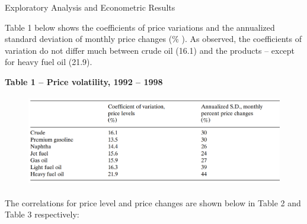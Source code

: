 \documentclass[12pt,twoside]{article}
\begin{document}
\begin{justify}
{\fontsize{11pt}{13.2pt}\selectfont Exploratory Analysis and Econometric Results\par}
\end{justify}\par

\begin{justify}
{\fontsize{11pt}{13.2pt}\selectfont Table 1 below shows the coefficients of price variations and the annualized standard deviation of monthly price changes ($\%$ ). As observed, the coefficients of variation do not differ much between crude oil (16.1) and the products – except for heavy fuel oil (21.9).\par}
\end{justify}\par

\setlength{\parskip}{6.0pt}
\begin{Center}
{\fontsize{11pt}{13.2pt}\selectfont \textbf{Table 1 – Price volatility, 1992 – 1998}\par}
\end{Center}\par




\begin{figure}[H]
	\begin{Center}
		\includegraphics[width=4.94in,height=1.59in]{./media/image3.png}
	\end{Center}
\end{figure}



\begin{justify}
{\fontsize{11pt}{13.2pt}\selectfont \par}
\end{justify}\par

\begin{justify}
{\fontsize{11pt}{13.2pt}\selectfont \par}
\end{justify}
\vspace{\baselineskip}\begin{justify}
{\fontsize{11pt}{13.2pt}\selectfont The correlations for price level and price changes are shown below in Table 2 and Table 3 respectively:\par}
\end{justify}\par
\end{document}
